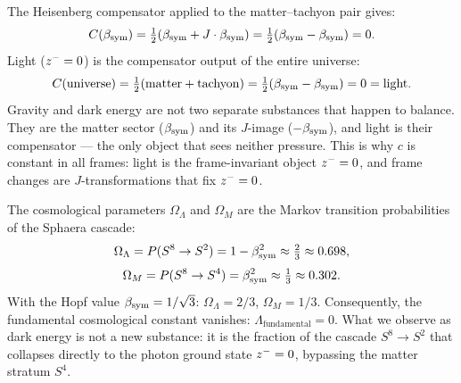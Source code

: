 \begin{remark}
The Heisenberg compensator applied to the matter--tachyon pair gives:
\[
 C(\beta_{\mathrm{sym}}) = \tfrac{1}{2}(\beta_{\mathrm{sym}}+J\cdot\beta_{\mathrm{sym}})
 = \tfrac{1}{2}(\beta_{\mathrm{sym}}-\beta_{\mathrm{sym}}) = 0.
\]
Light ($z^-=0$) is the compensator output of the entire universe:
\[
 C(\mathrm{universe})
 = \tfrac{1}{2}(\mathrm{matter}+\mathrm{tachyon})
 = \tfrac{1}{2}(\beta_{\mathrm{sym}}-\beta_{\mathrm{sym}}) = 0 = \mathrm{light}.
\]
Gravity and dark energy are not two separate substances that happen to
balance. They are the matter sector ($\beta_{\mathrm{sym}}$) and its $J$-image
($-\beta_{\mathrm{sym}}$), and light is their compensator --- the only object that
sees neither pressure.
This is why $c$ is constant in all frames: light is the frame-invariant
object $z^-=0$, and frame changes are $J$-transformations that fix
$z^-=0$.
\end{remark}

\begin{theorem}[Dark energy as cascade probability; $\Lambda=0$]
\label{thm:dark-energy}
The cosmological parameters $\Omega_\Lambda$ and $\Omega_M$ are the
Markov transition probabilities of the Sphaera cascade:
\[
 \Omega_\Lambda = P(S^8\to S^2) = 1-\beta_{\mathrm{sym}}^2\approx\tfrac{2}{3}\approx 0.698,
\]
\[
 \Omega_M = P(S^8\to S^4) = \beta_{\mathrm{sym}}^2\approx\tfrac{1}{3}\approx 0.302.
\]
With the Hopf value $\beta_{\mathrm{sym}}=1/\sqrt{3}$:
$\Omega_\Lambda=2/3$, $\Omega_M=1/3$.
Consequently, the fundamental cosmological constant vanishes:
$\Lambda_{\mathrm{fundamental}}=0$.
What we observe as dark energy is not a new substance: it is the
fraction of the cascade $S^8\to S^2$ that collapses directly to the
photon ground state $z^-=0$, bypassing the matter stratum $S^4$.
\end{theorem}

